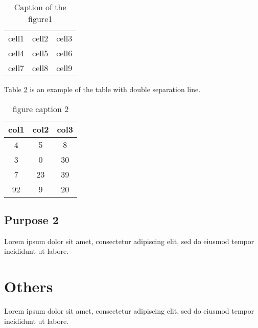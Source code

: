 \documentclass[12pt, a4paper]{report}
\begin{document}
\begin{table}
    \centering
    \begin{tabular}{c|c|c}
    \hline
    cell1 & cell2 & cell3 \\
    cell4 & cell5 & cell6 \\
    cell7 & cell8 & cell9 \\
    \hline
    \end{tabular}
    \caption{Caption of the figure1}
    \label{tab:my_label}
\end{table}


Table \ref{tab:double sep} is an example of the table with double separation line.
\begin{table}[h]
    \centering
    \begin{tabular}{||c c c||}
    \hline
    col1 & col2 & col3\\[0.5ex]
    \hline \hline
    4 & 5 & 8 \\
    \hline
    3 & 0 & 30 \\
    \hline
    7 & 23 & 39 \\
    \hline
    92 & 9 & 20 \\ [1ex]
    \hline
    \end{tabular}
    \caption{figure caption 2}
    \label{tab:double sep}
\end{table}

\subsection{Purpose 2}
Lorem ipsum dolor sit amet, consectetur adipiscing elit, sed do eiusmod tempor incididunt ut labore.

\section*{Others}
Lorem ipsum dolor sit amet, consectetur adipiscing elit, sed do eiusmod tempor incididunt ut labore.



\end{document}

